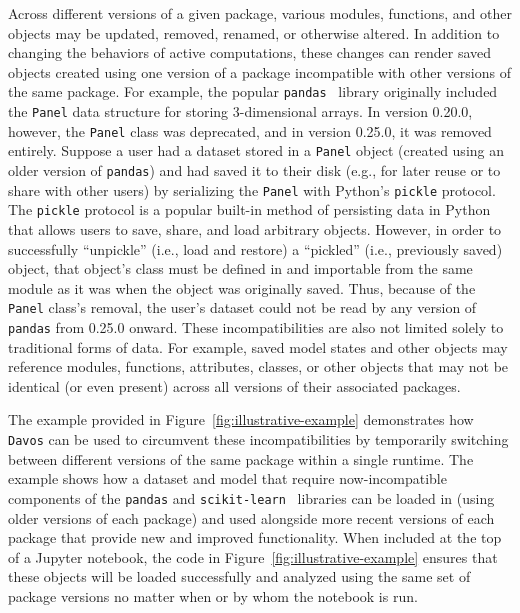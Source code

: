 \documentclass[preprint,12pt,a4paper]{elsarticle}
\begin{document}
Across different versions of a given package, various modules, functions,
and other objects may be updated, removed, renamed, or otherwise altered. In
addition to changing the behaviors of active computations, these changes can
render saved objects created using one version of a package incompatible with
other versions of the same package. For example, the popular
\texttt{pandas}~\cite{McKi10} library originally included the \texttt{Panel} data
structure for storing 3-dimensional arrays. In version 0.20.0, however, the
\texttt{Panel} class was deprecated, and in version 0.25.0, it was removed
entirely. Suppose a user had a dataset stored in a \texttt{Panel} object
(created using an older version of \texttt{pandas}) and had saved it to their
disk (e.g., for later reuse or to share with other users) by serializing the
\texttt{Panel} with Python's \texttt{pickle} protocol. The \texttt{pickle}
protocol is a popular built-in method of persisting data in Python that allows
users to save, share, and load arbitrary objects. However, in order to
successfully ``unpickle'' (i.e., load and restore) a ``pickled'' (i.e., previously saved)
object, that object's class must be defined in and importable from the same
module as it was when the object was originally saved. Thus, because of the \texttt{Panel} class's
removal, the user's dataset could not be read by any version of \texttt{pandas}
from 0.25.0 onward. These incompatibilities are also not limited solely to
traditional forms of data. For example, saved model states and other objects
may reference modules, functions, attributes, classes, or other objects that
may not be identical (or even present) across all versions of their associated
packages.

The example provided in Figure~\ref{fig:illustrative-example} demonstrates how
\texttt{Davos} can be used to circumvent these incompatibilities by
temporarily switching between different versions of the same package within a single runtime.
The example shows how a dataset and model that require
now-incompatible components of the \texttt{pandas} and
\texttt{scikit-learn}~\cite{PedrEtal11} libraries can be loaded in (using older
versions of each package) and used alongside more recent versions of each
package that provide new and improved functionality. When included at the top
of a Jupyter notebook, the code in Figure~\ref{fig:illustrative-example}
ensures that these objects will be loaded successfully and analyzed using the
same set of package versions no matter when or by whom the notebook is run.
\end{document}
